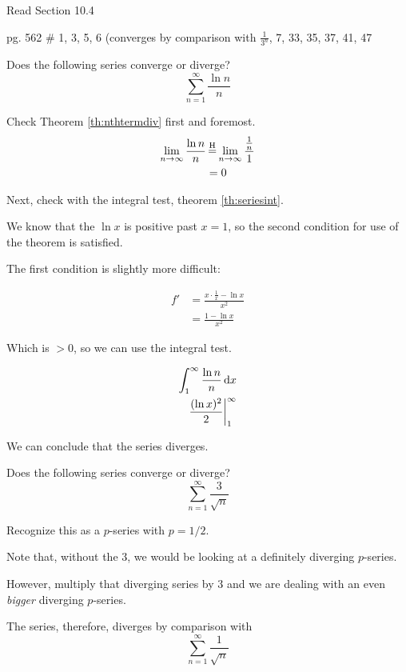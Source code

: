 \begin{homework}
  \date{30 March 2012}

  Read Section 10.4

  pg. 562 \# 1, 3, 5, 6 (converges by comparison with \(\frac{1}{3^n}\), 7, 33, 35, 37, 41, 47
\end{homework}
\begin{ex}
  Does the following series converge or diverge?
  \[ \sum_{n=1}^\infty \frac{\ln n}{n} \]
  \begin{sol}
    Check Theorem \ref{th:nthtermdiv} first and foremost.
    \begin{align*}
      \lim_{n \to \infty} \frac{\ln n}{n}
      &\=H \lim_{n \to \infty} \frac{\frac{1}{n}}{1} \\
      &= 0
    \end{align*}

    Next, check with the integral test, theorem \ref{th:seriesint}.

    We know that the \(\ln x\) is positive past \(x=1\), so the second condition
    for use of the theorem is satisfied.

    The first condition is slightly more difficult:

    \begin{align*}
      f' &= \frac{x \cdot \frac{1}{x}- \ln x}{x^2} \\
      &= \frac{1- \ln x}{x^2}
    \end{align*}

    Which is \( > 0 \), so we can use the integral test.

    \begin{align*}
      \int_{1}^{\infty} \frac{\ln n}{n} \,\mathrm{d} x \\
      \frac{(\ln x)^2}{2} \bigg|_{1}^{\infty}
    \end{align*}

    We can conclude that the series diverges.
  \end{sol}
\end{ex}
\begin{ex}
  Does the following series converge or diverge?
  \[ \sum^\infty_{n=1} \frac{3}{\sqrt{n}} \]
  \begin{sol}
    Recognize this as a \(p\)-series with \(p=1/2\).

    Note that, without the \(3\), we would be looking at a definitely diverging
    \(p\)-series.

    However, multiply that diverging series by \(3\) and we are dealing with an
    even \emph{bigger} diverging \(p\)-series.

    The series, therefore, diverges by comparison with \[
      \sum_{n=1}^\infty \frac{1}{\sqrt{n}} \]
  \end{sol}
\end{ex}
